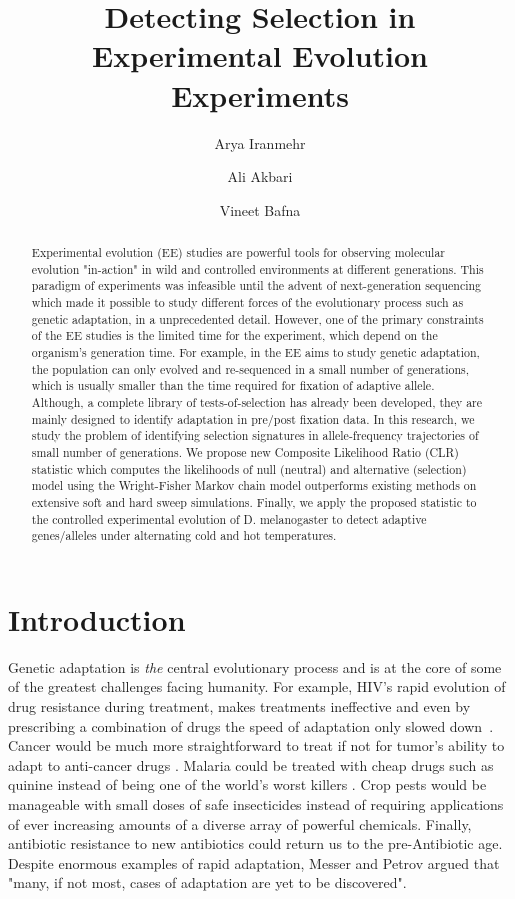 \documentclass[11pt]{article}
\title{Detecting Selection in Experimental Evolution Experiments}
\author[1]{Arya Iranmehr}
\author[1]{Ali Akbari}
\author[2]{Vineet Bafna}
\affil[1]{\footnotesize Electrical and Computer Engineering, University of California, San Diego, La Jolla, CA 92093, USA.}
\affil[2]{\footnotesize Computer Science \& Engineering, University of California, San Diego, La Jolla, CA 92093, USA}
\date{}
\begin{document}
\maketitle
\begin{abstract}
Experimental evolution (EE) studies are powerful tools for observing
molecular evolution "in-action" in wild and controlled environments at 
different generations. This 
paradigm of experiments was infeasible until the advent of
next-generation sequencing which made it possible to study different forces of 
the evolutionary process such as genetic adaptation, in  a unprecedented detail.
However, one of the primary constraints of the EE studies 
is the 
limited time for the experiment, which depend on the organism's generation 
time. 
For example, in the EE aims to study genetic adaptation, the population 
can only evolved and re-sequenced in a small number of generations, which is 
usually smaller than the time required for fixation of adaptive 
allele. Although, a 
complete library of tests-of-selection has already been developed, they are 
mainly designed 
to identify adaptation in pre/post fixation data.
In this research, we study the problem of identifying selection signatures in 
allele-frequency trajectories of small number of generations. 
We propose new Composite Likelihood Ratio 
(CLR) statistic which computes the likelihoods of null (neutral) and 
alternative (selection) model using the Wright-Fisher Markov chain model 
outperforms existing methods on extensive soft and hard sweep simulations. 
Finally, we apply the proposed statistic to the controlled experimental 
evolution of D. melanogaster to detect adaptive genes/alleles under alternating 
cold and hot temperatures.
\end{abstract}
\section{Introduction}
Genetic adaptation is \emph{the} central evolutionary process and is at the
 core of some of the greatest challenges facing humanity. 
For example, HIV's rapid evolution of drug resistance during treatment, makes 
treatments ineffective and even by prescribing a combination of drugs the speed 
of adaptation only slowed down~\cite{Feder2016More}. 
Cancer would be much more straightforward to treat if not for
tumor's ability to adapt to anti-cancer drugs 
\cite{gottesman2002mechanisms,zahreddine2013mechanisms}. 
Malaria could be treated with cheap drugs such as quinine instead of 
being one of the world's worst killers 
\cite{ariey2014molecular,nair2007recurrent}. 
Crop pests would be manageable with small doses of safe insecticides 
instead of requiring applications of ever increasing amounts of a diverse array 
of powerful chemicals\cite{daborn2001ddt}. 
Finally, antibiotic resistance \cite{spellberg2008epidemic} to new antibiotics 
could return us to the pre-Antibiotic age.
Despite enormous examples of rapid adaptation, Messer and Petrov 
\cite{messer2013population} argued that "many, if not most, cases of adaptation 
are yet to be discovered".
\end{document}
